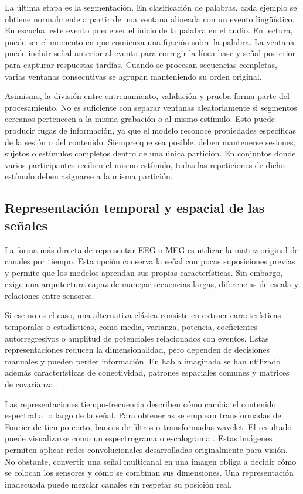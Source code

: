 La última etapa es la segmentación. En clasificación de palabras, cada ejemplo se obtiene normalmente a partir de una ventana alineada con un evento lingüístico. En escucha, este evento puede ser el inicio de la palabra en el audio. En lectura, puede ser el momento en que comienza una fijación sobre la palabra. La ventana puede incluir señal anterior al evento para corregir la línea base y señal posterior para capturar respuestas tardías. Cuando se procesan secuencias completas, varias ventanas consecutivas se agrupan manteniendo su orden original.

Asimismo, la división entre entrenamiento, validación y prueba forma parte del procesamiento. No es suficiente con separar ventanas aleatoriamente si segmentos cercanos pertenecen a la misma grabación o al mismo estímulo. Esto puede producir fugas de información, ya que el modelo reconoce propiedades específicas de la sesión o del contenido. Siempre que sea posible, deben mantenerse sesiones, sujetos o estímulos completos dentro de una única partición. En conjuntos donde varios participantes reciben el mismo estímulo, todas las repeticiones de dicho estímulo deben asignarse a la misma partición.

\subsection{Representación temporal y espacial de las señales}

La forma más directa de representar EEG o MEG es utilizar la matriz original de canales por tiempo. Esta opción conserva la señal con pocas suposiciones previas y permite que los modelos aprendan sus propias características. Sin embargo, exige una arquitectura capaz de manejar secuencias largas, diferencias de escala y relaciones entre sensores.

Si ese no es el caso, una alternativa clásica consiste en extraer características temporales o estadísticas, como media, varianza, potencia, coeficientes autorregresivos o amplitud de potenciales relacionados con eventos. Estas representaciones reducen la dimensionalidad, pero dependen de decisiones manuales y pueden perder información. En habla imaginada se han utilizado además características de conectividad, patrones espaciales comunes y matrices de covarianza \cite{panachakel2021covert,alzahrani2024systematic}.

Las representaciones tiempo-frecuencia describen cómo cambia el contenido espectral a lo largo de la señal. Para obtenerlas se emplean transformadas de Fourier de tiempo corto, bancos de filtros o transformadas wavelet. El resultado puede visualizarse como un espectrograma o escalograma \cite{dascoli2024words}. Estas imágenes permiten aplicar redes convolucionales desarrolladas originalmente para visión. No obstante, convertir una señal multicanal en una imagen obliga a decidir cómo se colocan los sensores y cómo se combinan sus dimensiones. Una representación inadecuada puede mezclar canales sin respetar su posición real.

